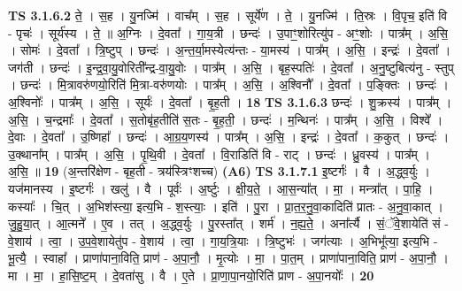 \documentclass[17pt]{extarticle}
\begin{document}
                  \newline
                                \textbf{ TS 3.1.6.2} \newline
                  ते॒ । स॒ह । यु॒नज्मि॑ । वाच᳚म् । स॒ह । सूर्ये॑ण । ते॒ । यु॒नज्मि॑ । ति॒स्रः । वि॒पृच॒ इति॑ वि - पृचः॑ । सूर्य॑स्य । ते॒ ॥ अ॒ग्निः । दे॒वता᳚ । गा॒य॒त्री । छन्दः॑ । उ॒पाꣳ॒॒शोरित्यु॑प - अꣳ॒॒शोः । पात्र᳚म् । अ॒सि॒ । सोमः॑ । दे॒वता᳚ । त्रि॒ष्टुप् । छन्दः॑ । अ॒न्त॒र्या॒मस्येत्य॑न्तः - या॒मस्य॑ । पात्र᳚म् । अ॒सि॒ । इन्द्रः॑ । दे॒वता᳚ । जग॑ती । छन्दः॑ । इ॒न्द्र॒वा॒यु॒वोरिती᳚न्द्र-वा॒यु॒वोः । पात्र᳚म् । अ॒सि॒ । बृह॒स्पतिः॑ । दे॒वता᳚ । अ॒नु॒ष्टुबित्य॑नु - स्तुप् । छन्दः॑ । मि॒त्रावरु॑णयो॒रिति॑ मि॒त्रा-वरु॑णयोः । पात्र᳚म् । अ॒सि॒ । अ॒श्विनौ᳚ । दे॒वता᳚ । प॒ङ्क्तिः । छन्दः॑ । अ॒श्विनोः᳚ । पात्र᳚म् । अ॒सि॒ । सूर्यः॑ । दे॒वता᳚ । बृ॒ह॒ती । \textbf{  18} \newline
                  \newline
                                \textbf{ TS 3.1.6.3} \newline
                  छन्दः॑ । शु॒क्रस्य॑ । पात्र᳚म् । अ॒सि॒ । च॒न्द्रमाः᳚ । दे॒वता᳚ । स॒तोबृ॑ह॒तीति॑ स॒तः - बृ॒ह॒ती॒ । छन्दः॑ । म॒न्थिनः॑ । पात्र᳚म् । अ॒सि॒ । विश्वे᳚ । दे॒वाः । दे॒वता᳚ । उ॒ष्णिहा᳚ । छन्दः॑ । आ॒ग्र॒य॒णस्य॑ । पात्र᳚म् । अ॒सि॒ । इन्द्रः॑ । दे॒वता᳚ । क॒कुत् । छन्दः॑ । उ॒क्थाना᳚म् । पात्र᳚म् । अ॒सि॒ । पृ॒थि॒वी । दे॒वता᳚ । वि॒राडिति॑ वि - राट् । छन्दः॑ । ध्रु॒वस्य॑ । पात्र᳚म् । अ॒सि॒ ॥ \textbf{  19} \newline
                  \newline
                      (अ॒न्तरि॑क्षेण - बृह॒ती - त्रय॑स्त्रिꣳशच्च)  \textbf{(A6)} \newline \newline
                                \textbf{ TS 3.1.7.1} \newline
                  इ॒ष्टर्गः॑ । वै । अ॒द्ध्व॒र्युः । यज॑मानस्य । इ॒ष्टर्गः॑ । खलु॑ । वै । पूर्वः॑ । अ॒र्ष्टुः । क्षी॒य॒ते॒ । आ॒स॒न्या᳚त् । मा॒ । मन्त्रा᳚त् । पा॒हि॒ । कस्याः᳚ । चि॒त् । अ॒भिश॑स्त्या॒ इत्य॒भि - श॒स्त्याः॒ । इति॑ । पु॒रा । प्रा॒त॒र॒नु॒वा॒कादिति॑ प्रातः - अ॒नु॒वा॒कात् । जु॒हु॒या॒त् । आ॒त्मने᳚ । ए॒व । तत् । अ॒द्ध्व॒र्युः । पु॒रस्ता᳚त् । शर्म॑ । न॒ह्य॒ते॒ । अना᳚र्त्यै । सं॒ॅवे॒शायेति॑ सं - वे॒शाय॑ । त्वा॒ । उ॒प॒वे॒शायेतु॑प - वे॒शाय॑ । त्वा॒ । गा॒य॒त्रि॒याः । त्रि॒ष्टुभः॑ । जग॑त्याः । अ॒भिभू᳚त्या॒ इत्य॒भि - भू॒त्यै॒ । स्वाहा᳚ । प्राणा॑पाना॒विति॒ प्राण॑ - अ॒पा॒नौ॒ । मृ॒त्योः । मा॒ । पा॒त॒म् । प्राणा॑पाना॒विति॒ प्राण॑ - अ॒पा॒नौ॒ । मा । मा॒ । हा॒सि॒ष्ट॒म् । दे॒वता॑सु । वै । ए॒ते । प्रा॒णा॒पा॒नयो॒रिति॑ प्राण - अ॒पा॒नयोः᳚ । \textbf{  20} \newline
\end{document}
